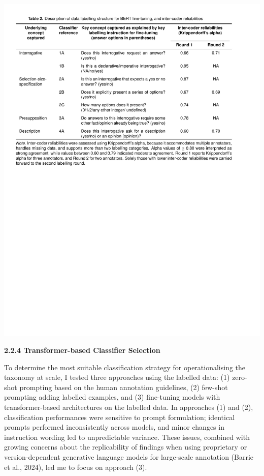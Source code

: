 \documentclass[
  12pt,
]{article}
\begin{document}
\begin{center}\includegraphics{../03_outputs/01_taxonomies_of_interrogatives/table_2} \end{center}

\textbf{2.2.4 Transformer-based Classifier Selection}

To determine the most suitable classification strategy for operationalising the taxonomy at scale, I tested three approaches using the labelled data: (1) zero-shot prompting based on the human annotation guidelines, (2) few-shot prompting adding labelled examples, and (3) fine-tuning models with transformer-based architectures on the labelled data. In approaches (1) and (2), classification performances were sensitive to prompt formulation; identical prompts performed inconsistently across models, and minor changes in instruction wording led to unpredictable variance. These issues, combined with growing concerns about the replicability of findings when using proprietary or version-dependent generative language models for large-scale annotation (Barrie et al., 2024), led me to focus on approach (3).
\end{document}
